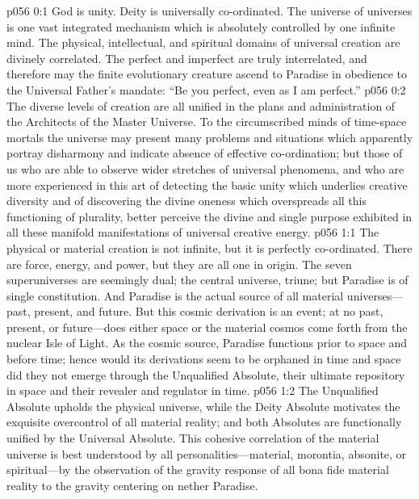 \author{Mighty Messenger and Machiventa Melchizedek}
\vs p056 0:1 God is unity. Deity is universally co\hyp{}ordinated. The universe of universes is one vast integrated mechanism which is absolutely controlled by one infinite mind. The physical, intellectual, and spiritual domains of universal creation are divinely correlated. The perfect and imperfect are truly interrelated, and therefore may the finite evolutionary creature ascend to Paradise in obedience to the Universal Father’s mandate: “Be you perfect, even as I am perfect.”
\vs p056 0:2 The diverse levels of creation are all unified in the plans and administration of the Architects of the Master Universe. To the circumscribed minds of time\hyp{}space mortals the universe may present many problems and situations which apparently portray disharmony and indicate absence of effective co\hyp{}ordination; but those of us who are able to observe wider stretches of universal phenomena, and who are more experienced in this art of detecting the basic unity which underlies creative diversity and of discovering the divine oneness which overspreads all this functioning of plurality, better perceive the divine and single purpose exhibited in all these manifold manifestations of universal creative energy.
\vs p056 1:1 The physical or material creation is not infinite, but it is perfectly co\hyp{}ordinated. There are force, energy, and power, but they are all one in origin. The seven superuniverses are seemingly dual; the central universe, triune; but Paradise is of single constitution. And Paradise is the actual source of all material universes---past, present, and future. But this cosmic derivation is an  event; at no past, present, or future---does either space or the material cosmos come forth from the nuclear Isle of Light. As the cosmic source, Paradise functions prior to space and before time; hence would its derivations seem to be orphaned in time and space did they not emerge through the Unqualified Absolute, their ultimate repository in space and their revealer and regulator in time.
\pc \vs p056 1:2 The Unqualified Absolute upholds the physical universe, while the Deity Absolute motivates the exquisite overcontrol of all material reality; and both Absolutes are functionally unified by the Universal Absolute. This cohesive correlation of the material universe is best understood by all personalities---material, morontia, absonite, or spiritual---by the observation of the gravity response of all bona fide material reality to the gravity centering on nether Paradise.
